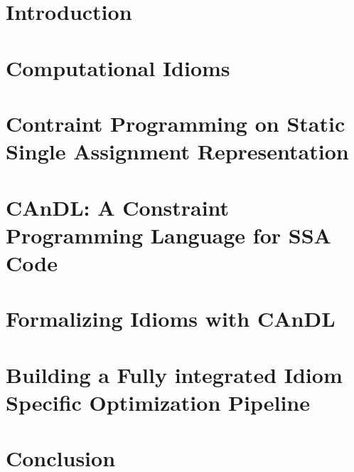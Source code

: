 \documentclass[phd,icsa,twoside,logo,11pt]{infthesis}
\begin{document}
\chapter{Introduction}
    

\chapter{Computational Idioms}
    

\chapter{Contraint Programming on Static Single Assignment Representation}
    

\chapter{CAnDL: A Constraint Programming Language for SSA Code}
    

\chapter{Formalizing Idioms with CAnDL}
    

\chapter{Building a Fully integrated Idiom Specific Optimization Pipeline}
    

\chapter{Conclusion}



\end{document}
